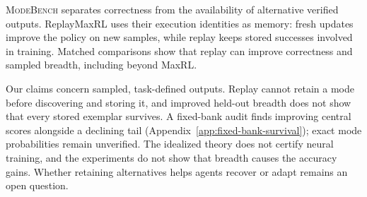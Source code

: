 \documentclass{article}
\newcommand{\1}{\mathbf 1}
\newcommand{\mb}{\textsc{ModeBench}}
\theoremstyle{remark}
\theoremstyle{definition}
\theoremstyle{plain}
\begin{document}
\mb{} separates correctness from the availability of alternative verified
outputs. ReplayMaxRL uses their execution identities as memory: fresh updates
improve the policy on new samples, while replay keeps stored successes involved
in training. Matched comparisons show that replay can improve correctness and
sampled breadth, including beyond MaxRL.

Our claims concern sampled, task-defined outputs. Replay cannot retain a mode
before discovering and storing it, and improved held-out breadth does not
show that every stored exemplar survives. A fixed-bank audit finds improving
central scores alongside a declining tail
(Appendix~\ref{app:fixed-bank-survival}); exact mode probabilities remain
unverified. The idealized theory does not certify neural training, and the
experiments do not show that breadth causes the accuracy gains. Whether retaining alternatives helps agents recover or adapt remains an open question.
\label{sec:main-end}

\clearpage
{}\label{sec:references}



\long{}
\end{document}
